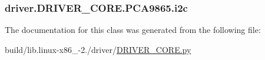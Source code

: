 \subsubsection[{i2c}]{\setlength{\rightskip}{0pt plus 5cm}driver.\+D\+R\+I\+V\+E\+R\+\_\+\+C\+O\+R\+E.\+P\+C\+A9865.\+i2c}\label{classdriver_1_1DRIVER__CORE_1_1PCA9865_a3a4b2748c61f79822d6602c941535bd2}


The documentation for this class was generated from the following file\+:\begin{DoxyCompactItemize}
\item 
build/lib.\+linux-\/x86\+\_-\/2./driver/\hyperlink{build_2lib_8linux-x86__64-2_87_2driver_2DRIVER__CORE_8py}{D\+R\+I\+V\+E\+R\+\_\+\+C\+O\+R\+E.\+py}\end{DoxyCompactItemize}
